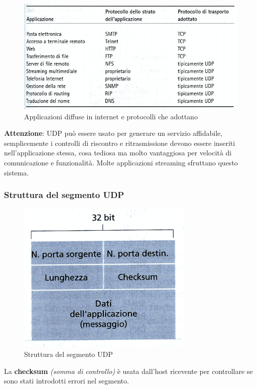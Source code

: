 \documentclass[11pt,a4paper]{article}
\begin{document}
\begin{figure}
	\includegraphics[scale=0.6]{img/014.png}
	\caption{Applicazioni diffuse in internet e protocolli che adottano}
\end{figure}
\textbf{Attenzione}: UDP può essere usato per generare un servizio affidabile, semplicemente i controlli di riscontro e ritrasmissione devono essere inseriti nell'applicazione stessa, cosa tediosa ma molto vantaggiosa per velocità di comunicazione e funzionalità. Molte applicazioni streaming sfruttano questo sistema. \\
\subsubsection{Struttura del segmento UDP}

\begin{figure}
	\includegraphics[scale=0.6]{img/015.png}
	\caption{Struttura del segmento UDP}
\end{figure}

La \textbf{checksum} \textit{(somma di controllo)} è usata dall'host ricevente per controllare se sono stati introdotti errori nel segmento.
\end{document}
